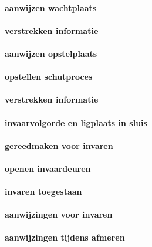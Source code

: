 \paragraph{aanwijzen wachtplaats}


\paragraph{verstrekken informatie}


\paragraph{aanwijzen opstelplaats}

\paragraph{opstellen schutproces}


\paragraph{verstrekken informatie}


\paragraph{invaarvolgorde en ligplaats in sluis}

\paragraph{gereedmaken voor invaren}



\paragraph{openen invaardeuren}




\paragraph{invaren toegestaan}

\paragraph{aanwijzingen voor invaren}
\paragraph{aanwijzingen tijdens afmeren}

